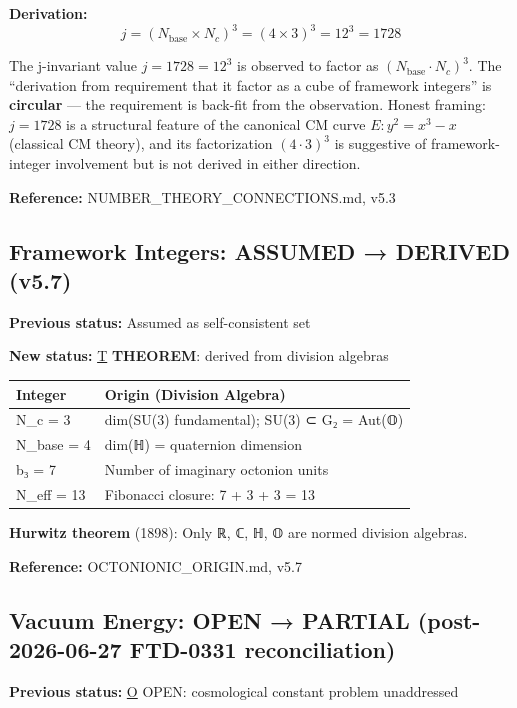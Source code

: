 \documentclass[
  11pt,
  letterpaper,
  twoside,
  openany]{book}
\makeatletter
\let\orig@subsection\subsection
\renewcommand{\subsection}{\needspace{6\baselineskip}\orig@subsection}
\makeatother
\begin{document}
\textbf{Derivation:}
\[j = (N_{\text{base}} \times N_c)^3 = (4 \times 3)^3 = 12^3 = 1728\]

The j-invariant value \(j = 1728 = 12^3\) is observed to factor as
\((N_\mathrm{base} \cdot N_c)^3\). The ``derivation from requirement
that it factor as a cube of framework integers'' is \textbf{circular}
--- the requirement is back-fit from the observation. Honest framing:
\(j = 1728\) is a structural feature of the canonical CM curve
\(E: y^2 = x^3 - x\) (classical CM theory), and its factorization
\((4 \cdot 3)^3\) is suggestive of framework-integer involvement but is
not derived in either direction.

\textbf{Reference:} NUMBER\_THEORY\_CONNECTIONS.md, v5.3

\subsection{Framework Integers: ASSUMED → DERIVED
(v5.7)}\label{framework-integers-assumed-derived-v5.7}

\textbf{Previous status:} Assumed as self-consistent set

\textbf{New status:} \hyperref[t]{T} \textbf{THEOREM}: derived from
division algebras

\begin{longtable}[]{@{}ll@{}}
\toprule\noalign{}
Integer & Origin (Division Algebra) \\
\midrule\noalign{}
\endhead
\bottomrule\noalign{}
\endlastfoot
N\_c = 3 & dim(SU(3) fundamental); SU(3) ⊂ G₂ = Aut(𝕆) \\
N\_base = 4 & dim(ℍ) = quaternion dimension \\
b₃ = 7 & Number of imaginary octonion units \\
N\_eff = 13 & Fibonacci closure: 7 + 3 + 3 = 13 \\
\end{longtable}

\textbf{Hurwitz theorem} (1898): Only ℝ, ℂ, ℍ, 𝕆 are normed division
algebras.

\textbf{Reference:} OCTONIONIC\_ORIGIN.md, v5.7

\subsection{Vacuum Energy: OPEN → PARTIAL (post-2026-06-27 FTD-0331
reconciliation)}\label{vacuum-energy-open-partial-post-2026-06-27-ftd-0331-reconciliation}

\textbf{Previous status:} \hyperref[o]{O} OPEN: cosmological constant
problem unaddressed
\end{document}
